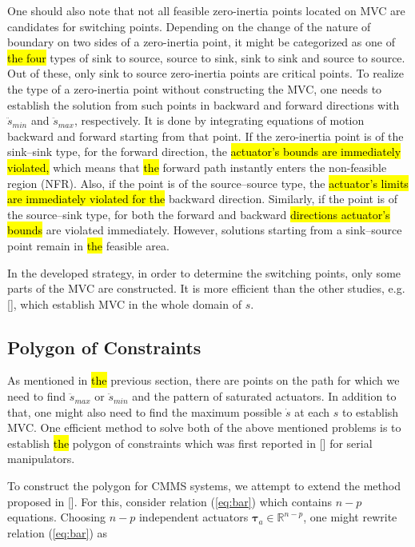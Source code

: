 \documentclass{rob}%
\begin{document}
One should also note that not all feasible zero-inertia points located on MVC are candidates for switching points. Depending on the change of the nature of boundary on two sides of a zero-inertia point, it might be categorized as one of \hl{the four} types of sink to source, source to sink, sink to sink and source to source. 
Out of these, only sink to source zero-inertia points are critical points. 
To realize the type of a zero-inertia point without constructing the MVC, one needs to establish the solution from such points in backward and forward directions with $ \ddot s_{min} $ and $ \ddot s_{max} $, respectively. It is done by integrating equations of motion backward and forward starting from that point. 
If the zero-inertia point is of the sink--sink type, for the forward direction, the \hl{actuator's bounds are immediately violated,} which means that \hl{the} forward path instantly enters the non-feasible region (NFR). 
Also, if the point is of the source--source type, the \hl{actuator's limits are immediately violated for the} backward direction. 
Similarly, if the point is of the source--sink type, for both the forward and backward \hl{directions actuator's bounds} are violated immediately. However, solutions starting from a sink--source point remain in \hl{the} feasible area.

In the developed strategy, in order to determine the switching points, only some parts of the MVC are constructed. It is more efficient than the other studies, e.g. [], which establish MVC in the whole domain of $ s $.

\subsection{Polygon of Constraints}
\label{subsec:POC}

As mentioned in \hl{the} previous section, there are points on the path for which we need to find $ \ddot s_{max} $ or $ \ddot s_{min} $ and the pattern of saturated actuators. In addition to that, one might also need to find the maximum possible $ \dot s $ at each $ s $ to establish MVC. One efficient method to solve both of the above mentioned problems is to establish \hl{the} polygon of constraints which was first reported in [] for serial manipulators.

To construct the polygon for CMMS systems, we attempt to extend the method proposed in [].
For this, consider relation (\ref{eq:bar}) which contains $ n-p $ equations. 
Choosing $ n-p $ independent actuators $ \boldsymbol \tau_{a}\in \mathbb{R}^{n-p} $, one might rewrite relation (\ref{eq:bar}) as
\end{document}
